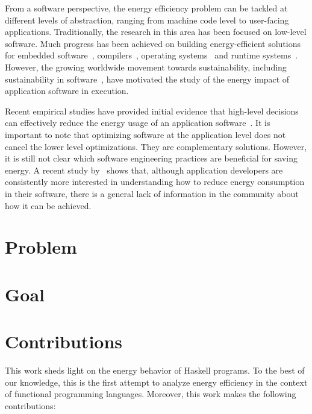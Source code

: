 From a software perspective, the energy efficiency problem can be tackled at different levels of abstraction, ranging from machine code level to user-facing applications. Traditionally, the research in this area has been focused on low-level software. Much progress has been achieved on building energy-efficient solutions for embedded software~\cite{tiwari:1994}, compilers~\cite{hsu:2003}, operating systems~\cite{merkel:2006} and runtime systems~\cite{ribic:2014, farkas:2000}. However, the growing worldwide movement towards sustainability, including sustainability in software~\cite{becker:2015}, have motivated the study of the energy impact of application software in execution.

Recent empirical studies have provided initial evidence that high-level decisions can effectively reduce the energy usage of an application software~\cite{chung:2001,hindle:2012,pinto:2014,trefethen:2013,manotas:2014,sahin:2014}. It is important to note that optimizing software at the application level does not cancel the lower level optimizations. They are complementary solutions. However, it is still not clear which software engineering practices are beneficial for saving energy. A recent study by~ shows that, although application developers are consistently more interested in understanding how to reduce energy consumption in their software, there is a general lack of information in the community about how it can be achieved.


\section{Problem}
\lipsum[1-2]


\section{Goal}
\lipsum[3-4]


\section{Contributions}
This work sheds light on the energy behavior of Haskell programs. To the best of our knowledge, this is the first attempt to analyze energy efficiency in the context of functional programming languages. Moreover, this work makes the following contributions:

